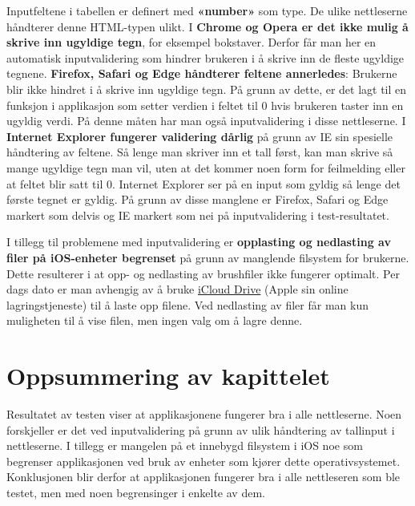 Inputfeltene i tabellen er definert med \textbf{«number»} som type. De ulike nettleserne håndterer denne HTML-typen ulikt. I \textbf{Chrome og Opera er det ikke mulig å skrive inn ugyldige tegn}, for eksempel bokstaver. Derfor får man her en automatisk inputvalidering som hindrer brukeren i å skrive inn de fleste ugyldige tegnene. \textbf{Firefox, Safari og Edge håndterer feltene annerledes}: Brukerne blir ikke hindret i å skrive inn ugyldige tegn. På grunn av dette, er det lagt til en funksjon i applikasjon som setter verdien i feltet til 0 hvis brukeren taster inn en ugyldig verdi. På denne måten har man også inputvalidering i disse nettleserne. I \textbf{Internet Explorer fungerer validering dårlig} på grunn av IE sin spesielle håndtering av feltene. Så lenge man skriver inn et tall først, kan man skrive så mange ugyldige tegn man vil, uten at det kommer noen form for feilmelding eller at feltet blir satt til 0. Internet Explorer ser på en input som gyldig så lenge det første tegnet er gyldig. På grunn av disse manglene er Firefox, Safari og Edge markert som delvis og IE markert som nei på inputvalidering i test-resultatet.

I tillegg til problemene med inputvalidering er \textbf{opplasting og nedlasting av filer på iOS-enheter begrenset} på grunn av manglende filsystem for brukerne. Dette resulterer i at opp- og nedlasting av brushfiler ikke fungerer optimalt. Per dags dato er man avhengig av å bruke \href{https://support.apple.com/kb/PH19386}{iCloud Drive} (Apple sin online lagringstjeneste) til å laste opp filene. Ved nedlasting av filer får man kun muligheten til å vise filen, men ingen valg om å lagre denne.

\section{Oppsummering av kapittelet}
Resultatet av testen viser at applikasjonene fungerer bra i alle nettleserne. Noen forskjeller er det ved inputvalidering på grunn av ulik håndtering av tallinput i nettleserne. I tillegg er mangelen på et innebygd filsystem i iOS noe som begrenser applikasjonen ved bruk av enheter som kjører dette operativsystemet. Konklusjonen blir derfor at applikasjonen fungerer bra i alle nettleseren som ble testet, men med noen begrensinger i enkelte av dem.
